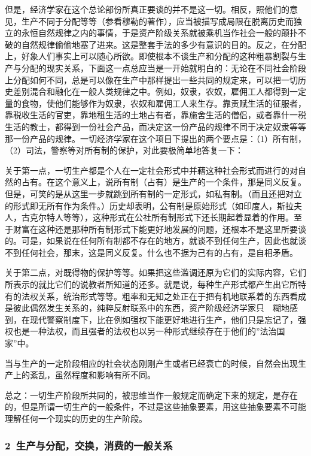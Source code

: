 \documentclass[a4paper,twoside,12pt]{ctexart}
\begin{document}
但是，经济学家在这个总论部份所真正要谈的并不是这一切。相反，照他们的意见，生产不同于分配等等（参看穆勒的著作），应当被描写成局限在脱离历史而独立的永恒自然规律之内的事情，于是资产阶级关系就被乘机当作社会一般的颠扑不破的自然规律偷偷地塞了进来。这是整套手法的多少有意识的目的。反之，在分配上，好象人们事实上可以随心所欲。即使根本不谈生产和分配的这种粗暴割裂与生产与分配的现实关系，下面这一点总应当是一开始就明白的：无论在不同社会阶段上分配如何不同，总是可以像在生产中那样提出一些共同的规定来，可以把一切历史差别混合和融化在一般人类规律之中。例如，奴隶，农奴，雇佣工人都得到一定量的食物，使他们能够作为奴隶，农奴和雇佣工人来生存。靠贡赋生活的征服者，靠税收生活的官吏，靠地租生活的土地占有者，靠施舍生活的僧侣，或者靠什一税生活的教士，都得到一份社会产品，而决定这一份产品的规律不同于决定奴隶等等那一份产品的规律。一切经济学家在这个项目下提出的两个要点是：（1）所有制，（2）司法，警察等对所有制的保护，对此要极简单地答复一下：

关于第一点，一切生产都是个人在一定社会形式中并藉这种社会形式而进行的对自然的占有。在这个意义上，说所有制（占有）是生产的一个条件，那是同义反复。但是，可笑的是从这里一步就跳到所有制的一定形式，如私有制。（而且还把对立的形式即无所有作为条件。）历史却表明，公有制是原始形式（如印度人，斯拉夫人，古克尔特人等等），这种形式在公社所有制形式下还长期起着显着的作用。至于财富在这种还是那种所有制形式下能更好地发展的问题，还根本不是这里所要谈的。可是，如果说在任何所有制都不存在的地方，就谈不到任何生产，因此也就谈不到任何社会，那末，这是同义反复。什么也不据为己有的占有，是自相矛盾。

关于第二点，对既得物的保护等等。如果把这些滥调还原为它们的实际内容，它们所表示的就比它们的说教者所知道的还多。就是说，每种生产形式都产生出它所特有的法权关系，统治形式等等。粗率和无知之处正在于把有机地联系着的东西看成是彼此偶然发生关系的，纯粹反射联系中的东西，资产阶级经济学家只　糊地感到，在现代警察制度下，比在例如强权下能更好地进行生产，他们只是忘记了，强权也是一种法权，而且强者的法权也以另一种形式继续存在于他们的”法治国家”中。

当与生产的一定阶段相应的社会状态刚刚产生或者已经衰亡的时候，自然会出现生产上的紊乱，虽然程度和影响有所不同。

总之：一切生产阶段所共同的，被思维当作一般规定而确定下来的规定，是存在的，但是所谓一切生产的一般条件，不过是这些抽象要素，用这些抽象要素不可能理解任何一个现实的历史的生产阶段。

\subsubsection{2~生产与分配，交换，消费的一般关系}
\end{document}
